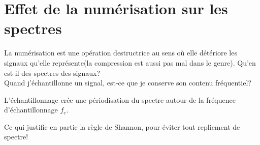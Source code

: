 \documentclass[11pt,a4paper]{article}
\newcounter{def}
\newcounter{prop}
\newcommand{\defprop}[2][]%
{ 
\addtocounter{prop}{1}
\begin{tcolorbox}[enhanced, arc=1ex,left=3pt,right=3pt,top=3pt,colbacktitle=white,colback=blue!10!white,coltitle=red!70!black, title =Propriété \theprop~#1\black, fonttitle=\sffamily\bfseries\large ]
#2
\end{tcolorbox}
}
\begin{document}
\section{Effet de la numérisation sur les spectres}
La numérisation est une opération destructrice au sens où elle détériore les signaux qu'elle  représente(la compression est aussi pas mal dans le genre). Qu'en est il des spectres des signaux?\\
Quand j'échantillonne un signal, est-ce que je conserve son contenu fréquentiel?
\defprop{L'échantillonnage crée une périodisation du spectre autour de la fréquence d'échantillonnage $f_e$.}
Ce qui justifie en partie la règle de Shannon, pour éviter tout repliement de spectre!
\end{document}
